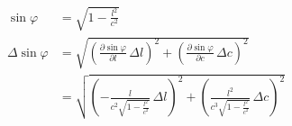 \begin{align}
  \sin\varphi &= \sqrt{1 - \frac{l^{2}}{c^{2}}} \label{eq:sin_phi} \\
  \Delta \sin\varphi &= \sqrt{\left(\frac{\partial \sin\varphi}{\partial l}\,\Delta l\right)^2 + \left(\frac{\partial \sin\varphi}{\partial c}\,\Delta c\right)^2} \nonumber \\
  &= \sqrt{\left(- \frac{l}{c^{2} \sqrt{1 - \frac{l^{2}}{c^{2}}}}\,\Delta l\right)^2 + \left(\frac{l^{2}}{c^{3} \sqrt{1 - \frac{l^{2}}{c^{2}}}}\,\Delta c\right)^2} \label{eq:dsin_phi}
\end{align}
